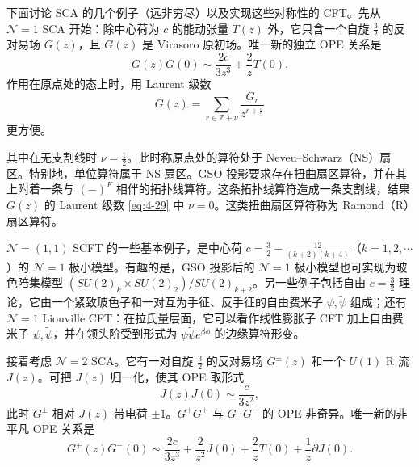 下面讨论 SCA 的几个例子（远非穷尽）以及实现这些对称性的 CFT。先从 $\mathcal{N}=1$ SCA 开始：除中心荷为 $c$ 的能动张量 $T(z)$ 外，它只含一个自旋 $\frac32$ 的反对易场 $G(z)$，且 $G(z)$ 是 Virasoro 原初场。唯一新的独立 OPE 关系是
\begin{equation}
  \label{eq:4-28}
  G(z)G(0)\sim\frac{2c}{3z^3}+\frac{2}{z}T(0).
\end{equation}
作用在原点处的态上时，用 Laurent 级数
\begin{equation}
  \label{eq:4-29}
  G(z)=\sum_{r\in\mathbb{Z}+\nu}\frac{G_r}{z^{r+\frac32}}
\end{equation}
更方便。


其中在无支割线时 $\nu=\frac12$。此时称原点处的算符处于 Neveu--Schwarz（NS）扇区。特别地，单位算符属于 NS 扇区。GSO 投影要求存在扭曲扇区算符，并在其上附着一条与 $(-)^F$ 相伴的拓扑线算符。这条拓扑线算符造成一条支割线，结果 $G(z)$ 的 Laurent 级数 \eqref{eq:4-29} 中 $\nu=0$。这类扭曲扇区算符称为 Ramond（R）扇区算符。

$\mathcal{N}=(1,1)$ SCFT 的一些基本例子，是中心荷 $c=\frac32-\frac{12}{(k+2)(k+4)}$（$k=1,2,\cdots$）的 $\mathcal{N}=1$ 极小模型。有趣的是，GSO 投影后的 $\mathcal{N}=1$ 极小模型也可实现为玻色陪集模型 $(SU(2)_k\times SU(2)_2)/SU(2)_{k+2}$。另一些例子包括自由 $c=\frac32$ 理论，它由一个紧致玻色子和一对互为手征、反手征的自由费米子 $\psi,\tilde\psi$ 组成；还有 $\mathcal{N}=1$ Liouville CFT：在拉氏量层面，它可以看作线性膨胀子 CFT 加上自由费米子 $\psi,\tilde\psi$，并在领头阶受到形式为 $\psi\tilde\psi e^{\beta\phi}$ 的边缘算符形变。

接着考虑 $\mathcal{N}=2$ SCA。它有一对自旋 $\frac32$ 的反对易场 $G^\pm(z)$ 和一个 $U(1)$ R 流 $J(z)$。可把 $J(z)$ 归一化，使其 OPE 取形式
\begin{equation}
  \label{eq:4-30}
  J(z)J(0)\sim\frac{c}{3z^2},
\end{equation}
此时 $G^\pm$ 相对 $J(z)$ 带电荷 $\pm1$。$G^+G^+$ 与 $G^-G^-$ 的 OPE 非奇异。唯一新的非平凡 OPE 关系是
\begin{equation}
  \label{eq:4-31}
  G^+(z)G^-(0)\sim\frac{2c}{3z^3}+\frac{2}{z^2}J(0)+\frac{2}{z}T(0)+\frac{1}{z}\partial J(0).
\end{equation}


